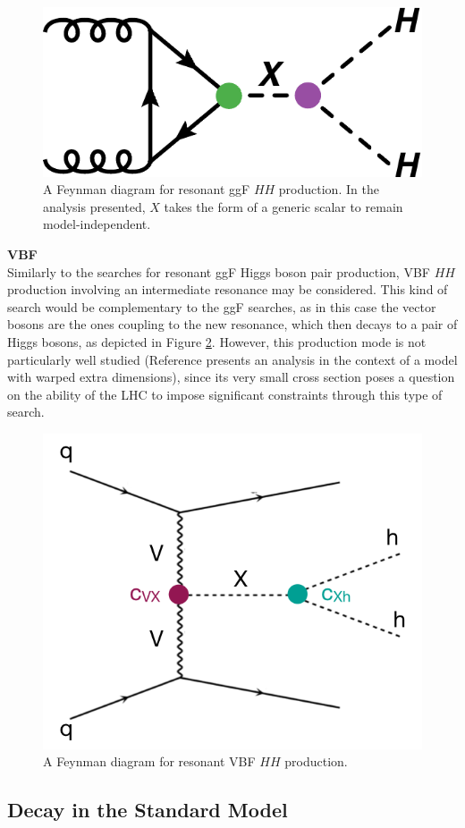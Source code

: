 \begin{figure}[!ht]
    \centering
    \includegraphics[width=.6\textwidth]{chapters/chapter1_theory/images/hh_res_ggf.pdf}
    \caption{A Feynman diagram for resonant ggF  $HH$ production. In the analysis presented, $X$ takes the form of a generic scalar to remain model-independent.}
    \label{fig:ggf-resonant}
\end{figure}

\noindent\textbf{VBF}\\
\indent Similarly to the searches for resonant ggF Higgs boson pair production, \gls{VBF} $HH$
production involving an intermediate resonance may be considered. This kind of search would be complementary to the ggF searches, as in this case the vector bosons are the ones coupling to the new resonance, which then decays to a pair of Higgs bosons, as depicted in Figure \ref{fig:vbf-resonant}. However, this production mode is not
particularly well studied (Reference \cite{res_vbf} presents an analysis in the context of a model with warped extra dimensions), since its very small cross section poses a question on the ability of the LHC to impose significant constraints through this type of search.

\begin{figure}[!ht]
    \centering
    \includegraphics[width=.55\textwidth]{chapters/chapter1_theory/images/vbf_resonant.png}
    \caption{A Feynman diagram for resonant VBF $HH$ production.}
    \label{fig:vbf-resonant}
\end{figure}

\subsection{Decay in the Standard Model}

